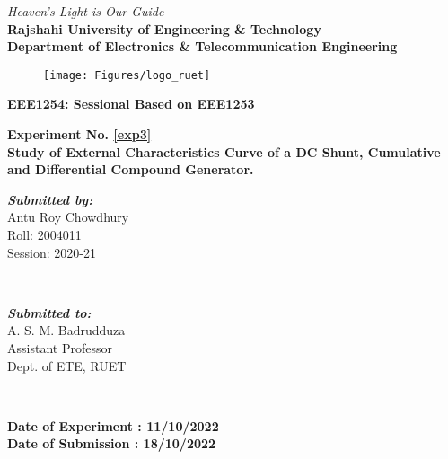\begin{titlepage}
\begin{center}
\textit{Heaven's Light is Our Guide}
\\[0.5cm]
\textbf{\Large Rajshahi University of Engineering \& Technology}
\\[0.3cm] 
\textbf{\large Department of Electronics \& Telecommunication Engineering}
\\[0.2cm]
\begin{figure}[!htbp]
    \centering
    \texttt{[image: Figures/logo\_ruet]}
    \label{fig:RUET logo}
\end{figure}
\textbf{\Large EEE1254: Sessional Based on EEE1253 }
\\[0.5cm]
\myrule[1pt][5pt]


\textbf{\Large  Experiment No. \ref{exp3}}
\\[.25cm]
\textbf{\large Study of External Characteristics Curve of a DC Shunt, Cumulative and Differential Compound Generator.}
\\ 
\myrule[1pt][5pt] 
\begin{minipage}{0.4\textwidth}
\vspace{0.5cm}
\begin{flushleft} 
\emph{\textbf{\large Submitted by:}}
\\
Antu Roy Chowdhury \\
Roll: 2004011 \\
Session: 2020-21
\end{flushleft}
\end{minipage}
~
\begin{minipage}{0.4\textwidth}
\vspace{0.5cm}
\begin{flushright} 
\emph{\textbf{\large Submitted to:}} 
\\
A. S. M. Badrudduza
\\
Assistant Professor
\\
Dept. of ETE, RUET
\\
\end{flushright}
\end{minipage}\\[0.7cm]
\makeatother

\textbf{Date of Experiment : 11/10/2022}\\
\textbf{Date of Submission : 18/10/2022}\\[1cm]


\end{center}
\end{titlepage}
